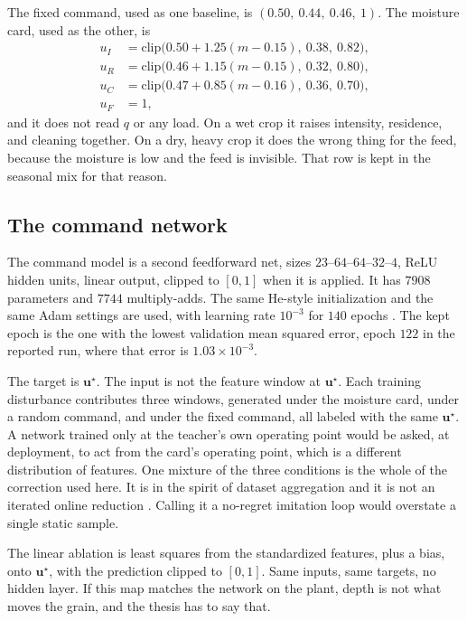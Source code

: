 The fixed command, used as one baseline, is \((0.50,\ 0.44,\ 0.46,\ 1)\). The moisture card, used as the other, is
\begin{equation}
\begin{aligned}
u_I &= \mathrm{clip}\big(0.50+1.25(m-0.15),\ 0.38,\ 0.82\big),\\
u_R &= \mathrm{clip}\big(0.46+1.15(m-0.15),\ 0.32,\ 0.80\big),\\
u_C &= \mathrm{clip}\big(0.47+0.85(m-0.16),\ 0.36,\ 0.70\big),\\
u_F &= 1,
\end{aligned}
\label{eq:card}
\end{equation}
and it does not read \(q\) or any load. On a wet crop it raises intensity, residence, and cleaning together. On a dry, heavy crop it does the wrong thing for the feed, because the moisture is low and the feed is invisible. That row is kept in the seasonal mix for that reason.

\subsection{The command network}

The command model is a second feedforward net, sizes \(23\)--\(64\)--\(64\)--\(32\)--\(4\), ReLU hidden units, linear output, clipped to \([0,1]\) when it is applied. It has \(7908\) parameters and \(7744\) multiply-adds. The same He-style initialization and the same Adam settings are used, with learning rate \(10^{-3}\) for \(140\) epochs \cite{he2015,kingma2015}. The kept epoch is the one with the lowest validation mean squared error, epoch \(122\) in the reported run, where that error is \(1.03\times 10^{-3}\).

The target is \(\mathbf{u}^\star\). The input is not the feature window at \(\mathbf{u}^\star\). Each training disturbance contributes three windows, generated under the moisture card, under a random command, and under the fixed command, all labeled with the same \(\mathbf{u}^\star\). A network trained only at the teacher's own operating point would be asked, at deployment, to act from the card's operating point, which is a different distribution of features. One mixture of the three conditions is the whole of the correction used here. It is in the spirit of dataset aggregation and it is not an iterated online reduction \cite{ross2011}. Calling it a no-regret imitation loop would overstate a single static sample.

The linear ablation is least squares from the standardized features, plus a bias, onto \(\mathbf{u}^\star\), with the prediction clipped to \([0,1]\). Same inputs, same targets, no hidden layer. If this map matches the network on the plant, depth is not what moves the grain, and the thesis has to say that.

